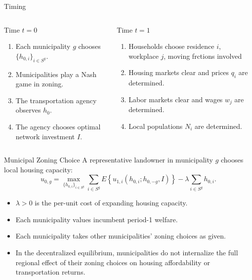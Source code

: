 \documentclass[10pt]{beamer}
\begin{document}
\begin{frame}{Timing}
\begin{columns}[T]
\begin{block}{Time $t=0$}
\begin{enumerate}
    \item Each municipality $g$ chooses $\{h_{0,i}\}_{i \in S^g}$.
    \item Municipalities play a Nash game in zoning.
    \item The transportation agency observes $h_0$.
    \item The agency chooses optimal network investment $I$.
\end{enumerate}
\end{block}

\begin{block}{Time $t=1$}
\begin{enumerate}
    \item Households choose residence $i$, workplace $j$, moving frctions involved
    \item Housing markets clear and prices $q_i$ are determined.
    \item Labor markets clear and wages $w_j$ are determined.
    \item Local populations $N_i$ are determined.
\end{enumerate}
\end{block}
\end{columns}

\vspace{0.25cm}\end{frame}

\begin{frame}{Municipal Zoning Choice}
A representative landowner in municipality $g$ chooses local housing capacity:
\[
u_{0,g}
=
\max_{\{h_{0,i}\}_{i \in S^g}}
\sum_{i \in S^g}
E\!\left\{
u_{1,i}(h_{0,i};h_{0,-g},I)
\right\}
-
\lambda \sum_{i \in S^g} h_{0,i}.
\]

\vspace{0.25cm}
\begin{itemize}
    \item $\lambda>0$ is the per-unit cost of expanding housing capacity.
    \item Each municipality values incumbent period-1 welfare.
    \item Each municipality takes other municipalities' zoning choices as given.
    \item In the decentralized equilibrium, municipalities do not internalize the full regional effect of their zoning choices on housing affordability or transportation returns.
\end{itemize}
\end{frame}
\end{document}
